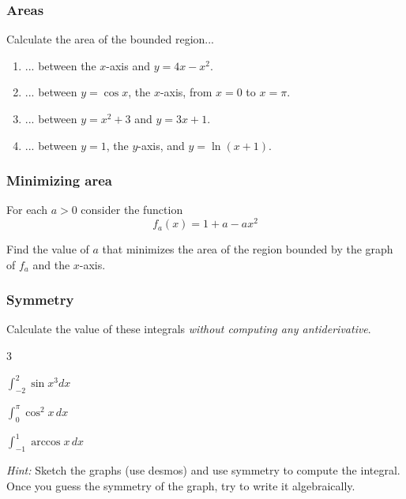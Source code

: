 \documentclass[14pt]{beamer}
\begin{document}
	\begin{frame}[t]
		\frametitle{Areas}

		Calculate the area of the bounded region...
		\vspace{.2cm}
		\begin{enumerate}
			\item ... between the $x$-axis and $\displaystyle y=4x-x^{2}$.
				\vspace{.2cm}

			\item ... between $y=\cos x$, the $x$-axis, from $x=0$ to $x=\pi$.
				\vspace{.2cm}

			\item ... between $\displaystyle y=x^{2}+3$ and $\displaystyle y=3x+1$.
				\vspace{.2cm}

			\item ... between $y=1$, the $y$-axis, and $y=\ln(x+1)$.
		\end{enumerate}
	\end{frame}

	\begin{frame}[t]
		\frametitle{Minimizing area}

		For each $a >0$ consider the function
		\[
			f_{a}(x) = 1 + a -ax^{2}
		\]

		Find the value of $a$ that minimizes the area of the region bounded by the graph
		of $f_{a}$ and the $x$-axis. \hfill
		\href{https://www.desmos.com/calculator/x7vkfcerdp}{}
	\end{frame}

	\begin{frame}[t]
		\frametitle{Symmetry}

		Calculate the value of these integrals \emph{without computing any
		antiderivative}.

		\begin{enumerate}
		\end{enumerate}

		\emph{Hint:} Sketch the graphs (use desmos) and use symmetry to compute the integral.
		\\ Once you guess the symmetry of the graph, try to write it algebraically.
		\hfill
		\href{https://www.desmos.com/calculator/ncysdsu3yv}{}
		\href{https://www.desmos.com/calculator/fwjs5zoury}{}
		\href{https://www.desmos.com/calculator/tjakgza6vf}{}
	\end{frame}
\end{document}
